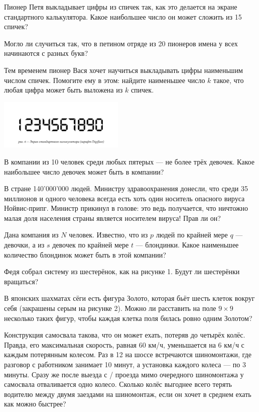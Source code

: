 \begin{itemize}
\itA Пионер Петя выкладывает цифры из спичек так, как это делается на экране стандартного калькулятора. Какое наибольшее число он может сложить из 15 спичек?

\itB Могло ли случиться так, что в петином отряде из 20 пионеров имена у всех начинаются с разных букв?

\itC Тем временем пионер Вася хочет научиться выкладывать цифры наименьшим числом спичек. Помогите ему в этом: найдите наименьшее число $k$ такое, что любая цифра может быть выложена из $k$ спичек. 
\end{itemize}

\begin{center}
  \includegraphics[width=6cm]{stats/2016/Figures/Digiface.png}
\end{center}

\begin{itemize}
\itA В компании из 10 человек среди любых пятерых — не более трёх девочек. Какое наибольшее число девочек может быть в компании?

\itB В стране 140'000'000 людей. Министру здравоохранения донесли, что среди 35 миллионов и одного человека всегда есть хоть один носитель опасного вируса Нойвис-припг. Министр прикинул в голове: это ведь получается, что ничтожно малая доля населения страны является носителем вируса! Прав ли он?

\itC Дана компания из $N$ человек. Известно, что из $p$ людей по крайней мере $q$ --- девочки, а из $s$ девочек по крайней мере $t$ --- блондинки. Какое наименьшее количество блондинок может быть в этой компании?
\end{itemize}

\begin{itemize}
\itA Федя собрал систему из шестерёнок, как на рисунке 1. Будут ли шестерёнки вращаться?

\itB В японских шахматах сёги есть фигура Золото, которая бьёт шесть клеток вокруг себя (закрашены серым на рисунке 2). Можно ли расставить на поле $9 \times 9$ несколько таких фигур, чтобы каждая клетка поля билась ровно одним Золотом?

\itC Конструкция самосвала такова, что он может ехать, потеряв до четырёх колёс. Правда, его максимальная скорость, равная 60 км/ч, уменьшается на 6 км/ч с каждым потерянным колесом. Раз в \SI{12}{} на шоссе встречаются шиномонтажи, где разговор с работником занимает 10 минут, а установка каждого колеса — по 3 минуты. Сразу же после выезда с / проезда мимо очередного шиномонтажа у самосвала отваливается одно колесо. Сколько колёс выгоднее всего терять водителю между двумя заездами на шиномонтаж, если он хочет в среднем ехать как можно быстрее?
\end{itemize}


